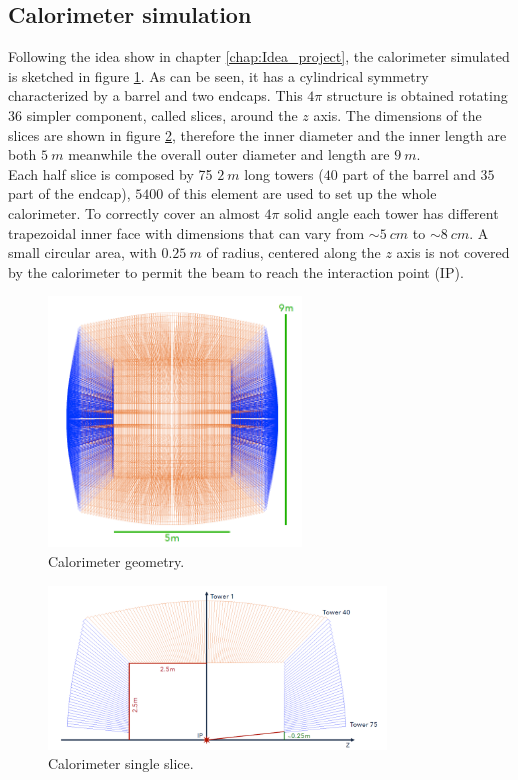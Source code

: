 \subsection{Calorimeter simulation} \label{subsec:Sim_cal}
Following the idea show in chapter \ref{chap:Idea_project}, the calorimeter simulated is sketched in figure \ref{fig:cal_geometry}. As can be seen, it has a cylindrical symmetry characterized by a barrel and two endcaps. This $4\pi$ structure is obtained rotating $36$ simpler component, called slices, around the $z$ axis. The dimensions of the slices are shown in figure \ref{fig:cal_slices}, therefore the inner diameter and  the inner length are both $5\ m$ meanwhile the overall outer diameter and length are $9\ m$.\\
Each half slice is composed by 75 $2\ m$ long towers ($40$ part of the barrel and $35$ part of the endcap), $5400$ of this element are used to set up the whole calorimeter.
To correctly cover an almost $4\pi$ solid angle each tower has different trapezoidal inner face with dimensions that can vary from $\sim 5\ cm$ to $\sim 8\ cm$.
A small circular area, with $0.25\ m$ of radius, centered along the $z$ axis is not covered by the calorimeter to permit the beam to reach the interaction point (IP).\\

\begin{figure}
	\centering
	\includegraphics[width=0.6\textwidth]{IMG/DRCGeometry3}
	\caption{Calorimeter geometry.}
	\label{fig:cal_geometry}
\end{figure}
\begin{figure}
	\centering
	\includegraphics[width=0.8\textwidth]{IMG/DRCGeometry1}
	\caption{Calorimeter single slice.}
	\label{fig:cal_slices}
\end{figure}

